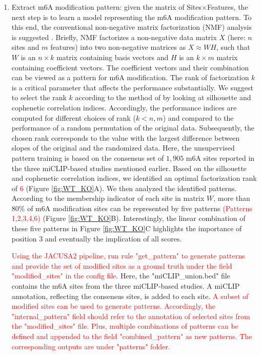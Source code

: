 \documentclass[times, 11pt, a4paper]{article}
\begin{document}
\begin{enumerate}
	\item Extract m6A modification pattern: given the matrix of Sites$\times$Features, the next step is to learn a model representing the m6A modification pattern. To this end, the conventional non-negative matrix factorization (NMF) analysis is suggested \citep{lee1999learning}. Briefly, NMF factorizes a non-negative data matrix $X$ (here: $n$ sites and $m$ features) into two non-negative matrices as $X \approx WH$, such that $W$ is an $n\times k$ matrix containing basis vectors and $H$ is an $k \times m$ matrix containing coefficient vectors. The coefficient vectors and their combination can be viewed as a pattern for m6A modification. The rank of factorization $k$ is a critical parameter that affects the performance substantially. We suggest to select the rank $k$ according to the method of \cite{frigyesi2008non} by looking at silhouette \citep{rousseeuw1987silhouettes} and cophenetic correlation \citep{brunet2004metagenes} indices. Accordingly, the performance indices are computed for different choices of rank ($k<n,m$) and compared to the performance of a random permutation of the original data. Subsequently, the chosen rank corresponds to the value with the largest difference between slopes of the original and the randomized data. Here, the unsupervised pattern training is based on the consensus set of $1,905$ m6A sites reported in the three miCLIP-based studies mentioned earlier. Based on the silhouette and cophenetic correlation indices, we identified an optimal factorization rank of \textcolor{red}{6} (Figure \ref{fig:WT_KO}A). We then analyzed the identified patterns. According to the membership indicator of each site in matrix $W$, more than $80\%$ of m6A modification sites can be represented by five patterns \textcolor{red}{(Patterns 1,2,3,4,6)} (Figure \ref{fig:WT_KO}B). Interestingly, the linear combination  of these five patterns in Figure \ref{fig:WT_KO}C highlights the importance of position 3 and eventually the implication of all scores. 
	
	\textcolor{red}{Using the JACUSA2 pipeline, run rule "get\_pattern" to generate patterns and provide the set of modified sites as a ground truth under the field "modified\_sites" in the config file}. Here, the "miCLIP\_union.bed" file contains the m6A sites from the three miCLIP-based studies. A miCLIP annotation, reflecting the consensus sites, is added to each site. \textcolor{red}{A subset of modified sites can be used to generate patterns. Accordingly, the "internal\_pattern" field should refer to the annotation of selected sites from the "modified\_sites" file. Plus, multiple combinations of patterns can be defined and appended to the field "combined\_pattern" as new patterns. The corresponding outputs are under "patterns" folder. } 
	

\end{enumerate}
\end{document}
